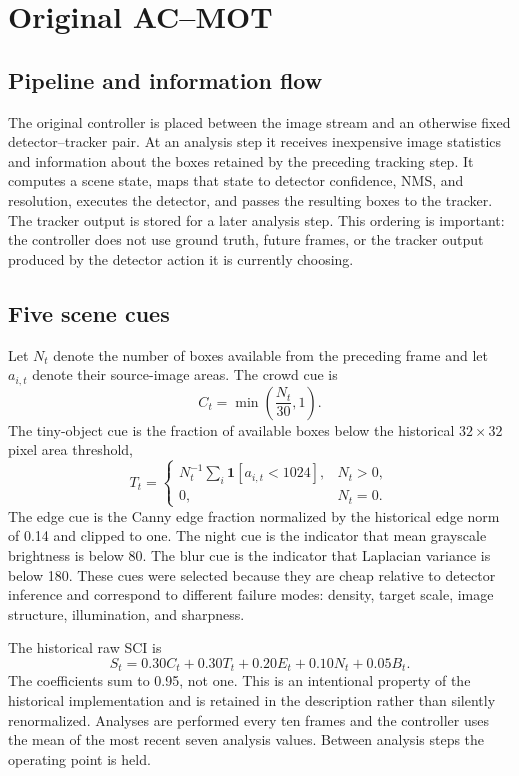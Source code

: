 \section{Original AC--MOT}
\subsection{Pipeline and information flow}
The original controller is placed between the image stream and an otherwise fixed detector--tracker pair. At an analysis step it receives inexpensive image statistics and information about the boxes retained by the preceding tracking step. It computes a scene state, maps that state to detector confidence, NMS, and resolution, executes the detector, and passes the resulting boxes to the tracker. The tracker output is stored for a later analysis step. This ordering is important: the controller does not use ground truth, future frames, or the tracker output produced by the detector action it is currently choosing.

\subsection{Five scene cues}
Let $N_t$ denote the number of boxes available from the preceding frame and let $a_{i,t}$ denote their source-image areas. The crowd cue is
\begin{equation}
C_t=\min\left(\frac{N_t}{30},1\right).
\end{equation}
The tiny-object cue is the fraction of available boxes below the historical $32\times32$ pixel area threshold,
\begin{equation}
T_t=\begin{cases}N_t^{-1}\sum_i\mathbf{1}[a_{i,t}<1024],&N_t>0,\\0,&N_t=0.\end{cases}
\end{equation}
The edge cue is the Canny edge fraction normalized by the historical edge norm of 0.14 and clipped to one. The night cue is the indicator that mean grayscale brightness is below 80. The blur cue is the indicator that Laplacian variance is below 180. These cues were selected because they are cheap relative to detector inference and correspond to different failure modes: density, target scale, image structure, illumination, and sharpness.

The historical raw SCI is
\begin{equation}
S_t=0.30C_t+0.30T_t+0.20E_t+0.10N_t+0.05B_t.
\end{equation}
The coefficients sum to 0.95, not one. This is an intentional property of the historical implementation and is retained in the description rather than silently renormalized. Analyses are performed every ten frames and the controller uses the mean of the most recent seven analysis values. Between analysis steps the operating point is held.

